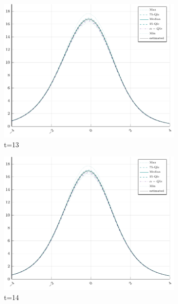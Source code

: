 \begin{figure}[H]
\begin{subfigure}[t]{0.31\textwidth}
		\centering
		\includegraphics[width=\linewidth]{Figures/real/13_infoplot.pdf}
		\caption{t=13} 
	\end{subfigure}
	\begin{subfigure}[t]{0.31\textwidth}
		\centering
		\includegraphics[width=\linewidth]{Figures/real/14_infoplot.pdf}
		\caption{t=14} 
	\end{subfigure}\\
	\begin{subfigure}[t]{0.31\textwidth}
		\centering

\end{subfigure}
\end{figure}
